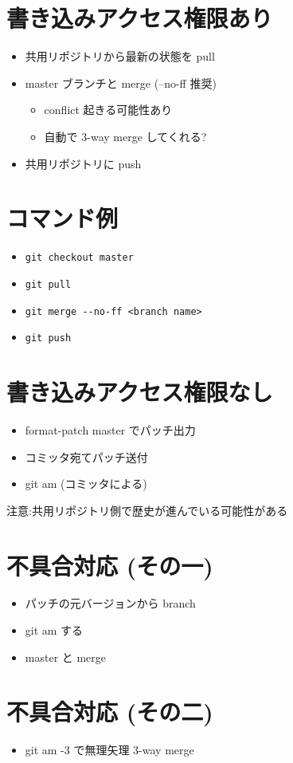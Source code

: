 \documentclass[slide,papersize]{jsarticle}
\begin{document}
\section*{書き込みアクセス権限あり}
\bigskip
\begin{itemize}
\item 共用リポジトリから最新の状態を pull
\bigskip
\item master ブランチと merge (--no-ff 推奨)
 \begin{itemize}
 \item conflict 起きる可能性あり
 \item 自動で 3-way merge してくれる?
 \end{itemize}
\bigskip
\item 共用リポジトリに push
\end{itemize}

\section*{コマンド例}
\medskip
\begin{itemize}
\item \begin{verbatim}git checkout master\end{verbatim}
\medskip
\item \begin{verbatim}git pull\end{verbatim}
\medskip
\item \begin{verbatim}git merge --no-ff <branch name>\end{verbatim}
\medskip
\item \begin{verbatim}git push\end{verbatim}
\end{itemize}

\section*{書き込みアクセス権限なし}
\bigskip
\begin{itemize}
\item format-patch master でパッチ出力
\bigskip
\item コミッタ宛てパッチ送付
\bigskip
\item git am (コミッタによる)
\end{itemize}
注意:共用リポジトリ側で歴史が進んでいる可能性がある

\section*{不具合対応 (その一)}
\bigskip
\begin{itemize}
\item パッチの元バージョンから branch
\bigskip
\item git am する
\bigskip
\item master と merge
\end{itemize}

\section*{不具合対応 (その二)}
\bigskip
\begin{itemize}
\item git am -3 で無理矢理 3-way merge
\end{itemize}
\end{document}
